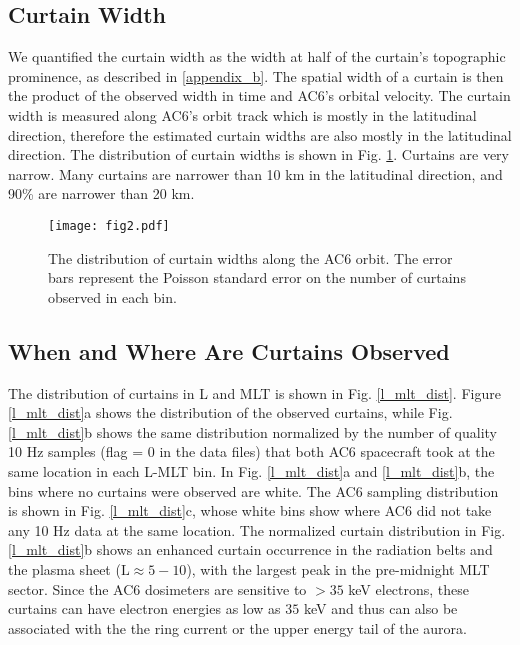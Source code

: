 \documentclass[draft]{agujournal2019}
\begin{document}
\subsection{Curtain Width}
We quantified the curtain width as the width at half of the curtain's topographic prominence, as described in \ref{appendix_b}. The spatial width of a curtain is then the product of the observed width in time and AC6's orbital velocity. The curtain width is measured along AC6's orbit track which is mostly in the latitudinal direction, therefore the estimated curtain widths are also mostly in the latitudinal direction. The distribution of curtain widths is shown in Fig. \ref{width_dist}. Curtains are very narrow. Many curtains are narrower than 10 km in the latitudinal direction, and 90\% are narrower than 20 km.

\begin{figure}
\texttt{[image: fig2.pdf]}
\caption{The distribution of curtain widths along the AC6 orbit. The error bars represent the Poisson standard error on the number of curtains observed in each bin.}
\label{width_dist}
\end{figure}

\subsection{When and Where Are Curtains Observed}
The distribution of curtains in L and MLT is shown in Fig. \ref{l_mlt_dist}. Figure \ref{l_mlt_dist}a shows the distribution of the observed curtains, while Fig. \ref{l_mlt_dist}b shows the same distribution normalized by the number of quality 10 Hz samples (flag = 0 in the data files) that both AC6 spacecraft took at the same location in each L-MLT bin. In Fig. \ref{l_mlt_dist}a and \ref{l_mlt_dist}b, the bins where no curtains were observed are white. The AC6 sampling distribution is shown in Fig. \ref{l_mlt_dist}c, whose white bins show where AC6 did not take any 10 Hz data at the same location. The normalized curtain distribution in Fig. \ref{l_mlt_dist}b shows an enhanced curtain occurrence in the radiation belts and the plasma sheet ($ \mathrm{L} \approx 5-10$), with the largest peak in the pre-midnight MLT sector. Since the AC6 dosimeters are sensitive to $> 35$ keV electrons, these curtains can have electron energies as low as $35$ keV and thus can also be associated with the the ring current or the upper energy tail of the aurora.
\end{document}
